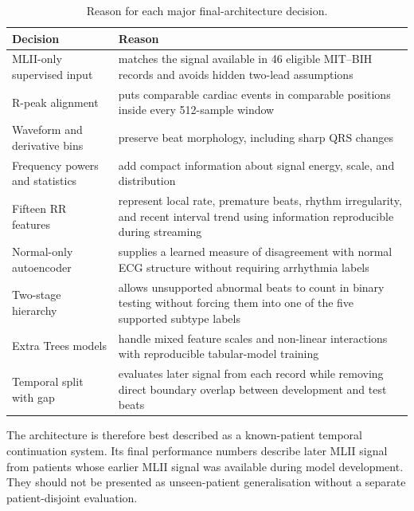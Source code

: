 \begin{table}[H]
\centering
\caption{Reason for each major final-architecture decision.}
\label{tab:final-design-rationale}
\begin{tabular}{>{\raggedright\arraybackslash}p{3.6cm}>{\raggedright\arraybackslash}p{9.6cm}}
\toprule
Decision & Reason\\
\midrule
MLII-only supervised input & matches the signal available in 46 eligible
MIT--BIH records and avoids hidden two-lead assumptions\\
R-peak alignment & puts comparable cardiac events in comparable positions
inside every 512-sample window\\
Waveform and derivative bins & preserve beat morphology, including sharp QRS
changes\\
Frequency powers and statistics & add compact information about signal energy,
scale, and distribution\\
Fifteen RR features & represent local rate, premature beats, rhythm
irregularity, and recent interval trend using information reproducible during
streaming\\
Normal-only autoencoder & supplies a learned measure of disagreement with
normal ECG structure without requiring arrhythmia labels\\
Two-stage hierarchy & allows unsupported abnormal beats to count in binary
testing without forcing them into one of the five supported subtype labels\\
Extra Trees models & handle mixed feature scales and non-linear interactions
with reproducible tabular-model training\\
Temporal split with gap & evaluates later signal from each record while
removing direct boundary overlap between development and test beats\\
\bottomrule
\end{tabular}
\end{table}

The architecture is therefore best described as a known-patient temporal
continuation system. Its final performance numbers describe later MLII signal
from patients whose earlier MLII signal was available during model development.
They should not be presented as unseen-patient generalisation without a
separate patient-disjoint evaluation.
